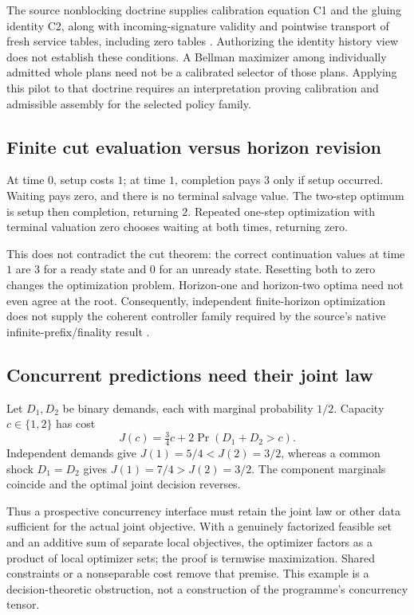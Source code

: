 \documentclass[11pt]{article}
\theoremstyle{definition}
\begin{document}
The source nonblocking doctrine supplies calibration equation C1 and the
gluing identity C2, along with incoming-signature validity and pointwise transport of fresh
service tables, including zero tables \cite{nonblocking}. Authorizing the
identity history view does not establish these conditions. A Bellman
maximizer among individually admitted whole plans need not be a calibrated
selector of those plans. Applying this pilot to that doctrine requires
an interpretation proving calibration and admissible assembly for the
selected policy family.

\subsection{Finite cut evaluation versus horizon revision}
At time \(0\), setup costs \(1\); at time \(1\), completion pays \(3\)
only if setup occurred. Waiting pays zero, and there is no terminal
salvage value. The two-step optimum is setup then completion, returning
\(2\). Repeated one-step optimization with terminal valuation zero
chooses waiting at both times, returning zero.

This does not contradict the cut theorem: the correct continuation
values at time \(1\) are \(3\) for a ready state and \(0\) for an unready
state. Resetting both to zero changes the optimization problem.
Horizon-one and horizon-two optima need not even agree at the root.
Consequently, independent finite-horizon optimization does not supply
the coherent controller family required by the source's native
infinite-prefix/finality result \cite{nonblocking}.

\subsection{Concurrent predictions need their joint law}
Let \(D_1,D_2\) be binary demands, each with marginal probability \(1/2\).
Capacity \(c\in\{1,2\}\) has cost
\[
 J(c)=\tfrac34c+2\Pr(D_1+D_2>c).
\]
Independent demands give
\(J(1)=5/4<J(2)=3/2\), whereas a common shock \(D_1=D_2\) gives
\(J(1)=7/4>J(2)=3/2\). The component marginals coincide and the
optimal joint decision reverses.

Thus a prospective concurrency interface must retain the joint law or
other data sufficient for the actual joint objective. With a genuinely
factorized feasible set and an additive sum of separate local objectives,
the optimizer factors as a product of local optimizer sets; the proof is
termwise maximization. Shared constraints or a nonseparable cost remove
that premise. This example is a decision-theoretic obstruction, not a
construction of the programme's concurrency tensor.
\end{document}
